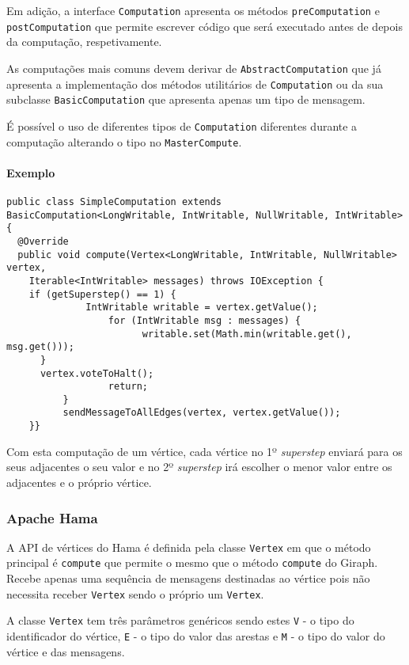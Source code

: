 Em adição, a interface \texttt{Computation} apresenta os métodos \texttt{preComputation} e \texttt{postComputation} que permite escrever código que será executado antes de depois da computação, respetivamente.

As computações mais comuns devem derivar de \texttt{AbstractComputation} que já apresenta a implementação dos métodos utilitários de \texttt{Computation} ou da sua subclasse \texttt{BasicComputation} que apresenta apenas um tipo de mensagem.

É possível o uso de diferentes tipos de \texttt{Computation} diferentes durante a computação alterando o tipo no \texttt{MasterCompute}.

\paragraph{Exemplo}
\begin{verbatim}
public class SimpleComputation extends 
BasicComputation<LongWritable, IntWritable, NullWritable, IntWritable> {
  @Override
  public void compute(Vertex<LongWritable, IntWritable, NullWritable> vertex,
	Iterable<IntWritable> messages) throws IOException {
    if (getSuperstep() == 1) {
		      IntWritable writable = vertex.getValue();
			      for (IntWritable msg : messages) {
				        writable.set(Math.min(writable.get(), msg.get()));
      }
      vertex.voteToHalt();
			      return;
		  }
		  sendMessageToAllEdges(vertex, vertex.getValue());
	}}
\end{verbatim}

Com esta computação de um vértice, cada vértice no 1º \textit{superstep} 
enviará para os seus adjacentes o seu valor e no 2º \textit{superstep} irá 
escolher o menor valor entre os adjacentes e o próprio vértice.

\subsubsection*{Apache Hama}
A API de vértices do Hama é definida pela classe \texttt{Vertex} em que o método principal é \texttt{compute} que permite o mesmo que o método \texttt{compute} do Giraph. Recebe apenas uma sequência de mensagens destinadas ao vértice pois não necessita receber \texttt{Vertex} sendo o próprio um \texttt{Vertex}.

A classe \texttt{Vertex} tem três parâmetros genéricos sendo estes \texttt{V} - o tipo do identificador do vértice, \texttt{E} - o tipo do valor das arestas e \texttt{M} - o tipo do valor do vértice e das mensagens.



